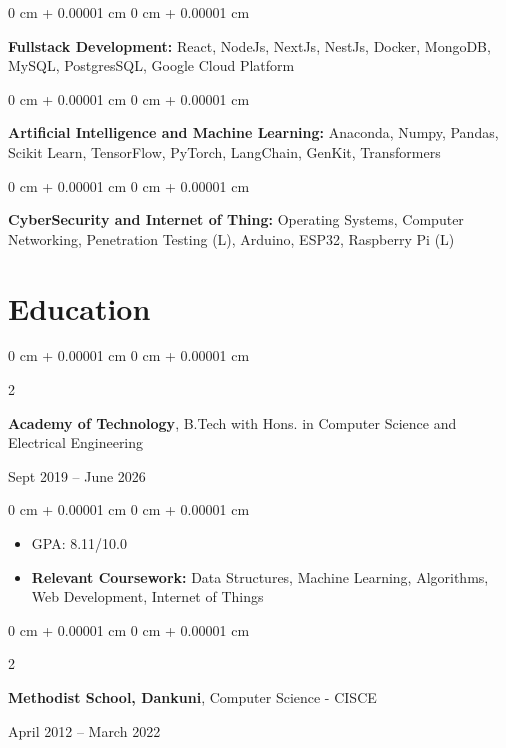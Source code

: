 \documentclass[9pt, letterpaper]{extarticle}
\newenvironment{highlights}{
    \begin{itemize}[
        topsep=0.10 cm,
        parsep=0.10 cm,
        partopsep=0pt,
        itemsep=0pt,
        leftmargin=0 cm + 10pt
    ]
}{
    \end{itemize}
} %
\newenvironment{onecolentry}{
    \begin{adjustwidth}{
        0 cm + 0.00001 cm
    }{
        0 cm + 0.00001 cm
    }
}{
    \end{adjustwidth}
} %
\newenvironment{twocolentry}[2][]{
    \onecolentry
    \def\secondColumn{#2}
    \setcolumnwidth{\fill, 4.5 cm}
    \begin{paracol}{2}
}{
    \switchcolumn \raggedleft \secondColumn
    \end{paracol}
    \endonecolentry
} %
\begin{document}
\vspace{0.2 cm}

\begin{onecolentry}
    \textbf{Fullstack Development:} React, NodeJs, NextJs, NestJs, Docker, MongoDB, MySQL, PostgresSQL, Google Cloud Platform
\end{onecolentry}

\vspace{0.2 cm}

\begin{onecolentry}
    \textbf{Artificial Intelligence and Machine Learning:} Anaconda, Numpy, Pandas, Scikit Learn, TensorFlow, PyTorch, LangChain, GenKit, Transformers
\end{onecolentry}

\vspace{0.2 cm}

\begin{onecolentry}
    \textbf{CyberSecurity and Internet of Thing:} Operating Systems, Computer Networking, Penetration Testing (L), Arduino, ESP32, Raspberry Pi (L)
\end{onecolentry}

\section{Education}

\begin{twocolentry}{
    Sept 2019 – June 2026
}
    \textbf{Academy of Technology}, B.Tech with Hons. in Computer Science and Electrical Engineering
\end{twocolentry}

\vspace{0.10 cm}

\begin{onecolentry}
    \begin{highlights}
        \item GPA: 8.11/10.0
        \item \textbf{Relevant Coursework:} Data Structures, Machine Learning, Algorithms, Web Development, Internet of Things
    \end{highlights}
\end{onecolentry}

\vspace{0.2 cm}

\begin{twocolentry}{
    April 2012 – March 2022
}
    \textbf{Methodist School, Dankuni}, Computer Science - CISCE
\end{twocolentry}
\end{document}
